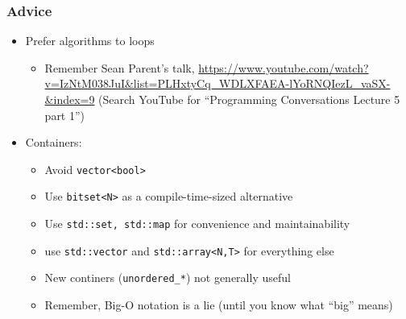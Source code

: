 \begin{frame}[fragile,t]
\frametitle{Advice}
\begin{itemize}[<+->]
\item Prefer algorithms to loops
\begin{itemize}
  \item Remember Sean Parent's talk, \url{https://www.youtube.com/watch?v=IzNtM038JuI&list=PLHxtyCq_WDLXFAEA-lYoRNQIezL_vaSX-&index=9}
(Search YouTube for ``Programming Conversations Lecture 5 part 1'')
\begin{center}
\end{center}
\end{itemize}
\item Containers:
  \begin{itemize}
    \item Avoid \texttt{vector<bool>}
    \item Use \texttt{bitset<N>} as a compile-time-sized alternative
    \item Use \texttt{std::set, std::map} for convenience and
      maintainability
    \item use \texttt{std::vector} and \texttt{std::array<N,T>} for
        everything else
      \item New continers (\texttt{unordered\_*}) not generally useful
        \item Remember, Big-O notation is a lie (until you know what
          ``big'' means)
  \end{itemize}
\end{itemize}
\end{frame}


